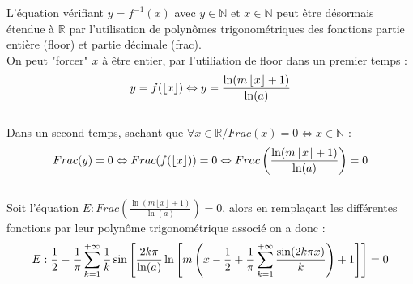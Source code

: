 \documentclass{article}
\begin{document}
L'équation vérifiant $y=f^{-1}(x)$ avec $y\in\mathbb{N}$ et $x\in\mathbb{N}$ peut être désormais étendue à $\mathbb{R}$ par l'utilisation de polynômes trigonométriques des fonctions partie entière (floor) et partie décimale (frac).\\
On peut "forcer" $x$ à être entier, par l'utiliation de floor dans un premier temps :\\
\begin{equation}
y = f(\left\lfloor x \right\rfloor) \Leftrightarrow y = \frac{\ln(m\left\lfloor x \right\rfloor+1)}{\ln(a)}\notag
\end{equation}\\
Dans un second temps, sachant que $\forall x \in\mathbb{R}/ Frac(x)=0 \Leftrightarrow x\in\mathbb{N}$ :\\
\begin{equation}
Frac(y)=0 \Leftrightarrow Frac(f(\left\lfloor x \right\rfloor)) = 0 \Leftrightarrow Frac\left(\frac{\ln(m\left\lfloor x \right\rfloor+1)}{\ln(a)}\right)=0\notag
\end{equation}\\
Soit l'équation $E : Frac\left(\frac{\ln(m\left\lfloor x \right\rfloor+1)}{\ln(a)}\right)=0$, alors en remplaçant les différentes fonctions par leur polynôme trigonométrique associé on a donc :\\
\begin{equation}
E : \frac{1}{2}-\frac{1}{\pi}\sum_{k=1}^{+\infty}\frac{1}{k}\sin\left[\frac{2k\pi}{\ln(a)}\ln\left[m\left(x-\frac{1}{2}+\frac{1}{\pi}\sum_{k=1}^{+\infty}\frac{\sin(2k\pi x)}{k}\right)+1\right]\right]=0\notag
\end{equation}\\
\end{document}
